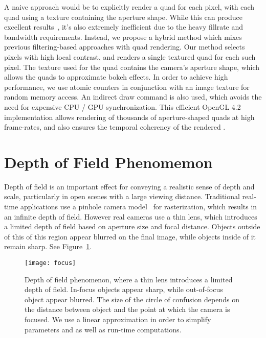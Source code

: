 A naive approach would be to explicitly render a quad for each pixel, with each quad using a texture containing the aperture shape. While this can produce excellent results~\cite{Sousa11,Futurmark11,Mittring11}, it's also extremely inefficient due to the heavy fillrate and bandwidth requirements. Instead, we propose a hybrid method which mixes previous filtering-based approaches with quad rendering. Our method selects pixels with high local contrast, and renders a single textured quad for each such pixel. The texture used for the quad contains the camera's aperture shape, which allows the quads to approximate bokeh effects. In order to achieve high performance, we use atomic counters in conjunction with an image texture for random memory access. An indirect draw command is also used, which avoids the need for expensive CPU / GPU synchronization. This efficient OpenGL 4.2 implementation allows rendering of thousands of aperture-shaped quads at high frame-rates, and also ensures the temporal coherency of the rendered \bokeh.

\section{Depth of Field Phenomemon}\label{Derousiers:DOFPhenomenon}
Depth of field is an important effect for conveying a realistic sense of depth and scale, particularly in open scenes with a large viewing distance. Traditional real-time applications use a pinhole camera model~\cite{Pharr10} for rasterization, which results in an infinite depth of field. However real cameras use a thin lens, which introduces a limited depth of field based on aperture size and focal distance. Objects outside of this of this region appear blurred on the final image, while objects inside of it remain sharp. See Figure~\ref{Derousiers:focus}.

	\begin{figure}[htb]\centering
	\texttt{[image: focus]}
	\caption{Depth of field phenomenon, where a thin lens introduces a limited depth of field. In-focus objects appear sharp, while out-of-focus object appear blurred. The size of the circle of confusion depends on the distance between object and the point at which the camera is focused. We use a linear approximation in order to simplify parameters and as well as run-time computations. }
	\label{Derousiers:focus}
	\end{figure}


